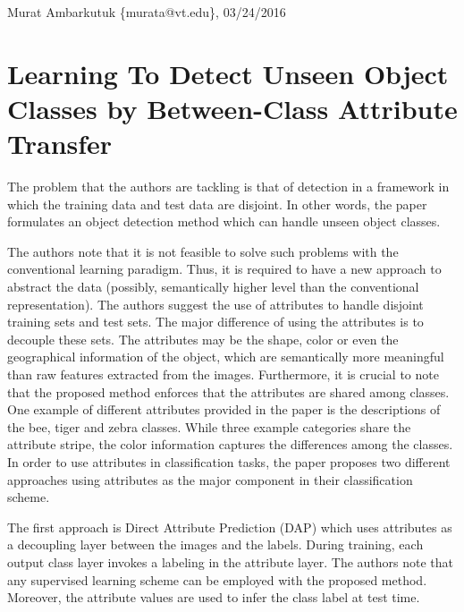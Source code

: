 \documentclass[11pt]{article}
\begin{document}
\thispagestyle{empty}
\begin{flushright}
	\small{Murat Ambarkutuk \{murata@vt.edu\}, 03/24/2016}
\end{flushright}
\section*{Learning To Detect Unseen Object Classes by Between-Class Attribute Transfer}
The problem that the authors are tackling is that of detection in a framework in which the training data and test data are disjoint.
In other words, the paper formulates an object detection method which can handle unseen object classes.

The authors note that it is not feasible to solve such problems with the conventional learning paradigm.
Thus, it is required to have a new approach to abstract the data (possibly, semantically higher level than the conventional representation).
The authors suggest the use of attributes to handle disjoint training sets and test sets.
The major difference of using the attributes is to decouple these sets.
The attributes may be the shape, color or even the geographical information of the object, which are semantically more meaningful than raw features extracted from the images.
Furthermore, it is crucial to note that the proposed method enforces that the attributes are shared among classes.
One example of different attributes provided in the paper is the descriptions of the bee, tiger and zebra classes.
While three example categories share the attribute stripe, the color information captures the differences among the classes.
In order to use attributes in classification tasks, the paper proposes two different approaches using attributes as the major component in their classification scheme.

The first approach is Direct Attribute Prediction (DAP) which uses attributes as a decoupling layer between the images and the labels.
During training, each output class layer invokes a labeling in the attribute layer.
The authors note that any supervised learning scheme can be employed with the proposed method.
Moreover, the attribute values are used to infer the class label at test time.
\end{document}
